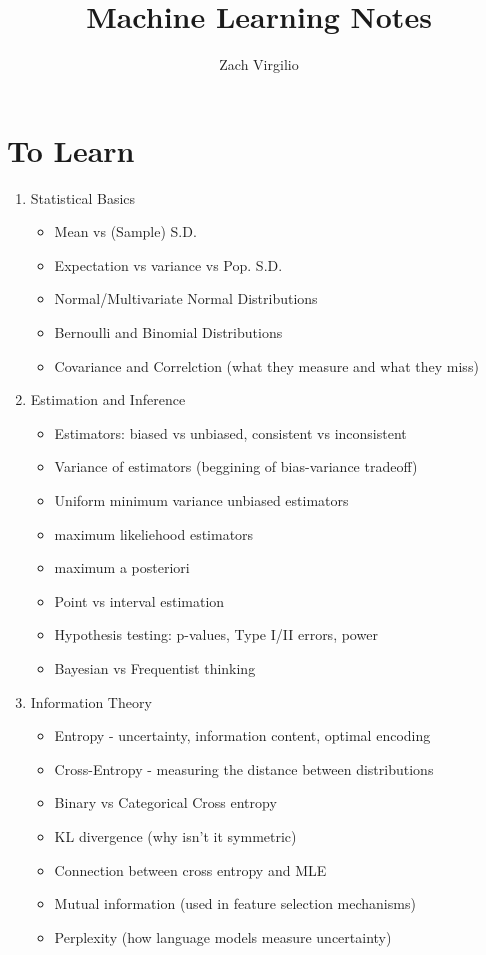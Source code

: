 \documentclass{article}
\begin{document}
\title{Machine Learning Notes}
\author{Zach Virgilio}
\maketitle 

\section*{To Learn}
\begin{enumerate}
    \item Statistical Basics
        \begin{itemize}
            \item Mean vs (Sample) S.D.
            \item Expectation vs variance vs Pop. S.D.
            \item Normal/Multivariate Normal Distributions
            \item Bernoulli and Binomial Distributions
            \item Covariance and Correlction (what they measure and what they miss)
        \end{itemize}

    \item Estimation and Inference
        \begin{itemize}
            \item Estimators: biased vs unbiased, consistent vs inconsistent
            \item Variance of estimators (beggining of bias-variance tradeoff)
            \item Uniform minimum variance unbiased estimators
            \item maximum likeliehood estimators
            \item maximum a posteriori
            \item Point vs interval estimation
            \item Hypothesis testing: p-values, Type I/II errors, power
            \item Bayesian vs Frequentist thinking
        \end{itemize}

    \item Information Theory
        \begin{itemize}
            \item Entropy - uncertainty, information content, optimal encoding
            \item Cross-Entropy - measuring the distance between distributions
            \item Binary vs Categorical Cross entropy
            \item KL divergence (why isn't it symmetric)
            \item Connection between cross entropy and MLE
            \item Mutual information (used in feature selection mechanisms)
            \item Perplexity (how language models measure uncertainty)
        \end{itemize}


\end{enumerate}
\end{document}

